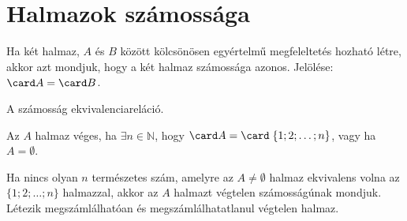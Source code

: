 \clearpage
\section{Halmazok számossága}\label{sec-01-04}

\begin{definition}
  Ha két halmaz, $A$ és $B$ között kölcsönösen egyértelmű megfeleltetés hozható
  létre, akkor azt mondjuk, hogy a két halmaz számossága azonos. Jelölése:
  $\card A = \card B$.
\end{definition}

\begin{note}
  A számosság ekvivalenciareláció.
\end{note}

\begin{definition}
  Az $A$ halmaz véges, ha $\exists n \in \mathbb N$, hogy $\card A = \card \; \{
    1; 2; \dots; n \}$, vagy ha $A = \emptyset$.
\end{definition}

\begin{note}
  Ha nincs olyan $n$ természetes szám, amelyre az $A \neq \emptyset$ halmaz
  ekvivalens volna az $\{ 1; 2; \dots; n \}$ halmazzal, akkor az $A$ halmazt
  végtelen számosságúnak mondjuk. Létezik megszámlálhatóan és
  megszámlálhatatlanul végtelen halmaz.
  \vspace{-5mm}
  \begin{center}
  \end{center}
\end{note}

